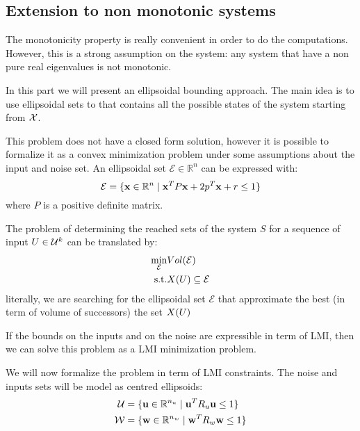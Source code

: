 
\subsection{Extension to non monotonic systems}
The monotonicity property is really convenient in order to do the computations.
However, this is a strong assumption on the system: any system that have a non pure real eigenvalues is not monotonic.

In this part we will present an ellipsoidal bounding approach.
The main idea is to use ellipsoidal sets to that contains all the possible states of the system starting from $\mathcal{X}$.

\newcommand{\ellipse}{\mathcal{E}}%
This problem does not have a closed form solution, however it is possible to formalize it as a convex minimization problem under some assumptions about the input and noise set.
An ellipsoidal set $\ellipse \in \mathbb{R}^n$ can be expressed with:
\begin{equation}
\ellipse  = \{\x \in \mathbb{R}^n \mid \x^T P \x + 2 p^T \x + r \leq 1 \} 
\end{equation}
where $P$ is a positive definite matrix.

The problem of determining the reached sets of the system $S$ for a sequence of input $U \in \mathcal{U}^k$ can be translated by:
\begin{equation} \label{min_prob}
\begin{aligned}
\min_{\ellipse} & Vol(\ellipse)\\
\textrm{s.t.}   & \X(U) \subseteq \ellipse
\end{aligned}
\end{equation}
literally, we are searching for the ellipsoidal set $\ellipse$ that approximate the best (in term of volume of successors) the set $X(U)$

If the bounds on the inputs and on the noise are expressible in term of LMI, then we can solve this problem as a LMI minimization problem.

We will now formalize the problem in term of LMI constraints.
The noise and inputs sets will be model as centred ellipsoids:
\begin{equation}
\begin{aligned}
\mathcal{U} &= \{  \mathbf{u} \in \mathbb{R}^{n_u} \mid  \mathbf{u}^T R_u  \mathbf{u} \leq 1 \}\\
\mathcal{W} &= \{  \mathbf{w} \in \mathbb{R}^{n_w} \mid  \mathbf{w}^T R_w  \mathbf{w} \leq 1 \}\\
\end{aligned}
\end{equation}

